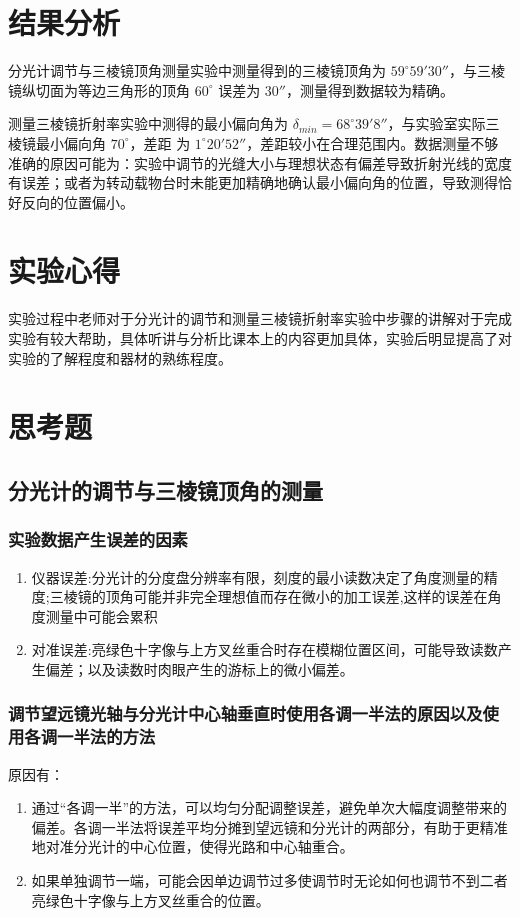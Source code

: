 \documentclass[UTF8]{ctexart}
\begin{document}
\newpage
\section{结果分析}
分光计调节与三棱镜顶角测量实验中测量得到的三棱镜顶角为 $59^{\circ}59'30''$，与三棱镜纵切面为等边三角形的顶角 $60^{\circ}$ 误差为 $30''$，测量得到数据较为精确。

测量三棱镜折射率实验中测得的最小偏向角为 $\delta_{min} = 68^{\circ}39'8''$，与实验室实际三棱镜最小偏向角 $70^{\circ}$，差距 为 $1^{\circ}20'52''$，差距较小在合理范围内。数据测量不够准确的原因可能为：实验中调节的光缝大小与理想状态有偏差导致折射光线的宽度有误差；或者为转动载物台时未能更加精确地确认最小偏向角的位置，导致测得恰好反向的位置偏小。

\section{实验心得}

实验过程中老师对于分光计的调节和测量三棱镜折射率实验中步骤的讲解对于完成实验有较大帮助，具体听讲与分析比课本上的内容更加具体，实验后明显提高了对实验的了解程度和器材的熟练程度。

\section{思考题}
\subsection{分光计的调节与三棱镜顶角的测量}
\subsubsection{实验数据产生误差的因素}
\begin{enumerate}
    \item 仪器误差:分光计的分度盘分辨率有限，刻度的最小读数决定了角度测量的精度;三棱镜的顶角可能并非完全理想值而存在微小的加工误差,这样的误差在角度测量中可能会累积
    \item 对准误差:亮绿色十字像与上方叉丝重合时存在模糊位置区间，可能导致读数产生偏差；以及读数时肉眼产生的游标上的微小偏差。
\end{enumerate}
\subsubsection{调节望远镜光轴与分光计中心轴垂直时使用各调一半法的原因以及使用各调一半法的方法}
原因有：
\begin{enumerate}
    \item 通过“各调一半”的方法，可以均匀分配调整误差，避免单次大幅度调整带来的偏差。各调一半法将误差平均分摊到望远镜和分光计的两部分，有助于更精准地对准分光计的中心位置，使得光路和中心轴重合。
    \item 如果单独调节一端，可能会因单边调节过多使调节时无论如何也调节不到二者亮绿色十字像与上方叉丝重合的位置。
\end{enumerate}
\end{document}
